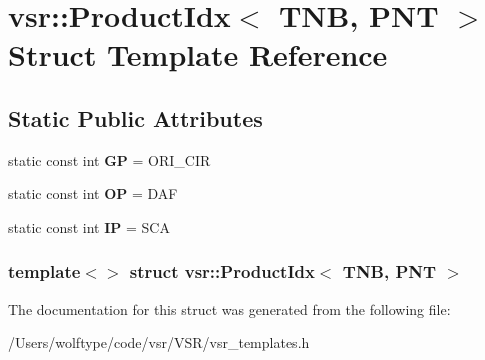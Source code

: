 \hypertarget{structvsr_1_1_product_idx_3_01_t_n_b_00_01_p_n_t_01_4}{\section{vsr\-:\-:Product\-Idx$<$ T\-N\-B, P\-N\-T $>$ Struct Template Reference}
\label{structvsr_1_1_product_idx_3_01_t_n_b_00_01_p_n_t_01_4}
}
\subsection*{Static Public Attributes}
\begin{DoxyCompactItemize}
\item 
\hypertarget{structvsr_1_1_product_idx_3_01_t_n_b_00_01_p_n_t_01_4_a12fa4ea20a9c27ec532724fb9ce64127}{static const int {\bfseries G\-P} = O\-R\-I\-\_\-\-C\-I\-R}\label{structvsr_1_1_product_idx_3_01_t_n_b_00_01_p_n_t_01_4_a12fa4ea20a9c27ec532724fb9ce64127}

\item 
\hypertarget{structvsr_1_1_product_idx_3_01_t_n_b_00_01_p_n_t_01_4_a360d00cda01e6f96f1f2a4a8398a562f}{static const int {\bfseries O\-P} = D\-A\-F}\label{structvsr_1_1_product_idx_3_01_t_n_b_00_01_p_n_t_01_4_a360d00cda01e6f96f1f2a4a8398a562f}

\item 
\hypertarget{structvsr_1_1_product_idx_3_01_t_n_b_00_01_p_n_t_01_4_ad980d1e23e94b07f8e64dfc889905b80}{static const int {\bfseries I\-P} = S\-C\-A}\label{structvsr_1_1_product_idx_3_01_t_n_b_00_01_p_n_t_01_4_ad980d1e23e94b07f8e64dfc889905b80}

\end{DoxyCompactItemize}
\subsubsection*{template$<$$>$ struct vsr\-::\-Product\-Idx$<$ T\-N\-B, P\-N\-T $>$}



The documentation for this struct was generated from the following file\-:\begin{DoxyCompactItemize}
\item 
/\-Users/wolftype/code/vsr/\-V\-S\-R/vsr\-\_\-templates.\-h\end{DoxyCompactItemize}
